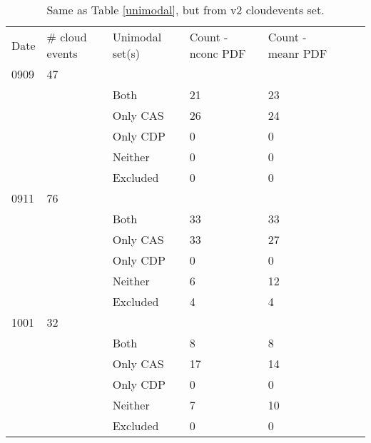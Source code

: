 \documentclass{article}
\begin{document}
\begin{table}[ht]
\centering
\begin{tabular}{lllllll}
Date & \# cloud events    & Unimodal set(s) & Count - nconc PDF & Count - meanr PDF\\
0909 & 47                 &                 &                   &                          \\
     &                    & Both            & 21                & 23                       \\
     &                    & Only CAS        & 26                & 24                       \\
     &                    & Only CDP        & 0                 & 0                        \\
     &                    & Neither         & 0                 & 0                        \\
     &                    & Excluded        & 0                 & 0                        \\
0911 & 76                 &                 &                   &                          \\
     &                    & Both            & 33                & 33                       \\
     &                    & Only CAS        & 33                & 27                       \\
     &                    & Only CDP        & 0                 & 0                        \\
     &                    & Neither         & 6                 & 12                       \\
     &                    & Excluded        & 4                 & 4                        \\
1001 & 32                 &                 &                   &                          \\
     &                    & Both            & 8                 & 8                        \\
     &                    & Only CAS        & 17                & 14                       \\
     &                    & Only CDP        & 0                 & 0                        \\
     &                    & Neither         & 7                 & 10                       \\
     &                    & Excluded        & 0                 & 0                       
\end{tabular}
\caption{Same as Table \ref{unimodal}, but from v2 cloudevents set.}
\label{unimodal2}
\end{table}
\end{document}

